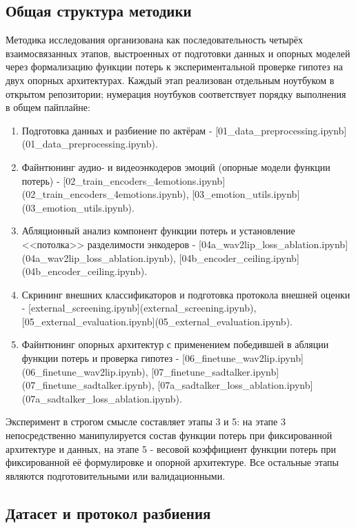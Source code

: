 \documentclass[a4paper, 12pt, oneside, openany]{article}
\begin{document}
\subsection{Общая структура методики}

Методика исследования организована как последовательность четырёх взаимосвязанных этапов, выстроенных от подготовки данных и опорных моделей через формализацию функции потерь к экспериментальной проверке гипотез на двух опорных архитектурах. Каждый этап реализован отдельным ноутбуком в открытом репозитории; нумерация ноутбуков соответствует порядку выполнения в общем пайплайне:
\begin{enumerate}
\item Подготовка данных и разбиение по актёрам - [01\_data\_preprocessing.ipynb](01\_data\_preprocessing.ipynb).
\item Файнтюнинг аудио- и видеоэнкодеров эмоций (опорные модели функции потерь) - [02\_train\_encoders\_4emotions.ipynb](02\_train\_encoders\_4emotions.ipynb), [03\_emotion\_utils.ipynb](03\_emotion\_utils.ipynb).
\item Абляционный анализ компонент функции потерь и установление <<потолка>> разделимости энкодеров - [04a\_wav2lip\_loss\_ablation.ipynb](04a\_wav2lip\_loss\_ablation.ipynb), [04b\_encoder\_ceiling.ipynb](04b\_encoder\_ceiling.ipynb).
\item Скрининг внешних классификаторов и подготовка протокола внешней оценки - [external\_screening.ipynb](external\_screening.ipynb), [05\_external\_evaluation.ipynb](05\_external\_evaluation.ipynb).
\item Файнтюнинг опорных архитектур с применением победившей в абляции функции потерь и проверка гипотез - [06\_finetune\_wav2lip.ipynb](06\_finetune\_wav2lip.ipynb), [07\_finetune\_sadtalker.ipynb](07\_finetune\_sadtalker.ipynb), [07a\_sadtalker\_loss\_ablation.ipynb](07a\_sadtalker\_loss\_ablation.ipynb).
\end{enumerate}

Эксперимент в строгом смысле составляет этапы 3 и 5: на этапе 3 непосредственно манипулируется состав функции потерь при фиксированной архитектуре и данных, на этапе 5 - весовой коэффициент функции потерь при фиксированной её формулировке и опорной архитектуре. Все остальные этапы являются подготовительными или валидационными.

\subsection{Датасет и протокол разбиения}
\end{document}
